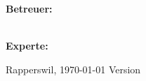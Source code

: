 \begin{titlepage}
\begin{flushleft}
		\textbf{\LARGE Betreuer:}\\
		\Large \proff\\
		\vspace{0.5cm}
		
		\textbf{\LARGE Experte:}\\
		\Large \proff
		\vspace{0.5cm}
		
		\vspace{2cm}
		 Rapperswil, \today
		\hfill
		Version \version
	\end{flushleft}

\end{titlepage}

\restoregeometry
